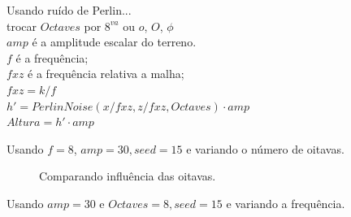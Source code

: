 Usando ruído de Perlin...\\
trocar $Octaves$ por $8^{va}$ ou $o$, $O$, $\phi$\\
$amp$ é a amplitude escalar do terreno.\\
$f$ é a frequência;\\
$fxz$ é a frequência relativa a malha;\\
$fxz = k/f$\\
$h' = PerlinNoise(x/fxz, z/fxz, Octaves) \cdot amp$\\
$Altura = h' \cdot amp$

Usando $f = 8$, $amp = 30, seed = 15$ e variando o número de oitavas.

\begin{figure}[H]
     \centering
     \hspace{0.1cm}
     \hspace{0.1cm}
     \caption{Comparando influência das oitavas.}
     \label{fig:parametrosOctaves}
\end{figure}

Usando $amp = 30$ e $Octaves = 8, seed = 15$ e variando a frequência.

